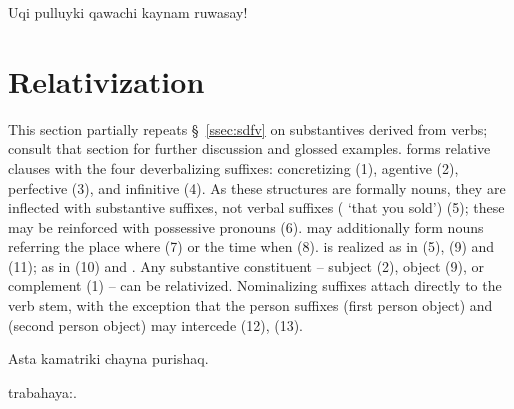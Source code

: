 %
{\textexclamdown{}Uqi pulluyki qawachi kaynam ruwasay!}%
{}%
{}{}%

\section{Relativization}
This section partially repeats \S~\ref{ssec:sdfv} on substantives derived from verbs; consult that section for further discussion and glossed examples. \SYQ{} forms relative clauses with the four deverbalizing suffixes: concretizing  (1), agentive  (2), perfective  (3), and infinitive  (4). As these structures are formally nouns, they are inflected with substantive suffixes, not verbal suffixes (  `that you sold') (5); these may be reinforced with possessive pronouns (6).  may additionally form nouns referring the place where  (7) or the time when  (8).  is realized as  in \ACH{} (5), \AMV{} (9) and \SP{} (11); as  in \LT{} (10) and \CH{}. Any substantive constituent -- subject (2), object (9), or complement (1) -- can be relativized. Nominalizing suffixes attach directly to the verb stem, with the exception that the person suffixes  (first person object) and  (second person object) may intercede (12), (13).

%
{Asta kamatriki chayna purishaq.}%
{}%
{}{}%

%
{ trabahaya:.}%
{}%
{}{}%

